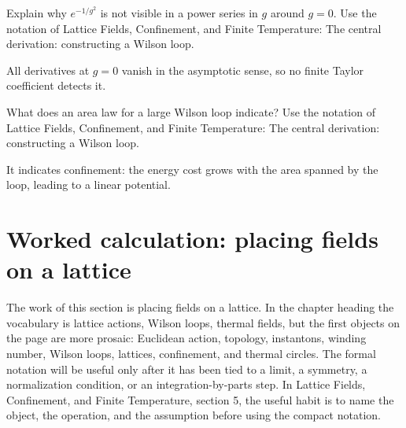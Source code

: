 \begin{exercise}
Explain why \(e^{-1/g^2}\) is not visible in a power series in \(g\) around \(g=0\).  Use the notation of Lattice Fields, Confinement, and Finite Temperature: The central derivation: constructing a Wilson loop.
\begin{answer}
All derivatives at \(g=0\) vanish in the asymptotic sense, so no finite Taylor coefficient detects it.
\end{answer}
\end{exercise}

\begin{exercise}
What does an area law for a large Wilson loop indicate?  Use the notation of Lattice Fields, Confinement, and Finite Temperature: The central derivation: constructing a Wilson loop.
\begin{answer}
It indicates confinement: the energy cost grows with the area spanned by the loop, leading to a linear potential.
\end{answer}
\end{exercise}



\section{Worked calculation: placing fields on a lattice}













The work of this section is placing fields on a lattice.  In the chapter heading the vocabulary is lattice actions, Wilson loops, thermal fields, but the first objects on the page are more prosaic: Euclidean action, topology, instantons, winding number, Wilson loops, lattices, confinement, and thermal circles.  The formal notation will be useful only after it has been tied to a limit, a symmetry, a normalization condition, or an integration-by-parts step.  In Lattice Fields, Confinement, and Finite Temperature, section 5, the useful habit is to name the object, the operation, and the assumption before using the compact notation.

